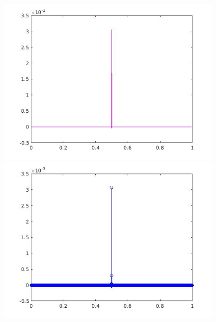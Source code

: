 \documentclass[a4paper,11pt]{article}
\begin{document}
\begin{figure}[!hp]
\centering
\begin{minipage}{.5\textwidth}
  \centering
  \includegraphics[width=1\linewidth]{images/lab2_22.jpg}
\end{minipage}%
\begin{minipage}{.5\textwidth}
  \centering
  \includegraphics[width=1\linewidth]{images/lab2_23.jpg}
\end{minipage}
\end{figure}

\newpage
\end{document}
